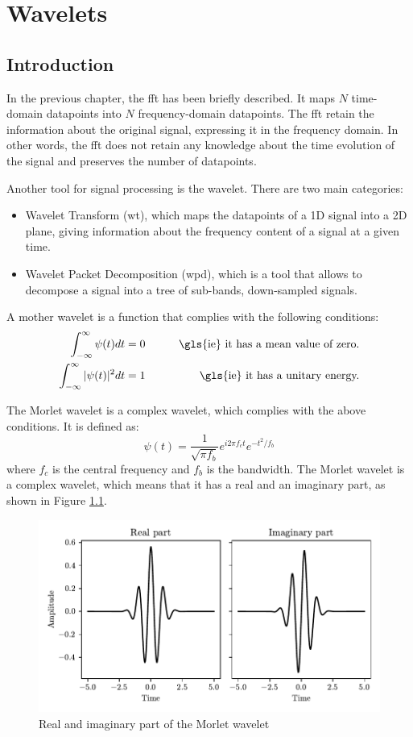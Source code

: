 \chapter{Wavelets}
\label{app:wavelet}

\section{Introduction}
In the previous chapter, the \gls{fft} has been briefly described. It maps $N$ time-domain datapoints into $N$ frequency-domain datapoints. The \gls{fft} retain the information about the original signal, expressing it in the frequency domain. In other words, the \gls{fft} does not retain any knowledge about the time evolution of the signal and preserves the number of datapoints.

Another tool for signal processing is the wavelet. There are two main categories:
\begin{itemize}
\item  Wavelet Transform (\gls{wt}), which maps the datapoints of a 1D signal into a 2D plane, giving information about the frequency content of a signal at a given time.
\item Wavelet Packet Decomposition (\gls{wpd}), which is a tool that allows to decompose a signal into a tree of sub-bands, down-sampled signals. 
\end{itemize}

A mother wavelet is a function that complies with the following conditions:
\begin{align}
\int_{-\infty}^{\infty} \psi(t) dt = 0 & \qquad &\text{\gls{ie} it has a mean value of zero.} \\
\int_{-\infty}^{\infty} |\psi(t)|^2 dt = 1 & \qquad &\text{\gls{ie} it has a unitary energy.}
\end{align}

The Morlet wavelet is a complex wavelet, which complies with the above conditions. It is defined as:
\begin{equation}
\psi(t) = \frac{1}{\sqrt{\pi f_b}} e^{i 2 \pi f_c t} e^{-t^2/f_b}
\end{equation}
where $f_c$ is the central frequency and $f_b$ is the bandwidth. The Morlet wavelet is a complex wavelet, which means that it has a real and an imaginary part, as shown in Figure \ref{fig:morlet}. 

\begin{figure}
\centering
\includegraphics[]{images/morlet.pdf}
\caption{Real and imaginary part of the Morlet wavelet}
\label{fig:morlet}
\end{figure}
